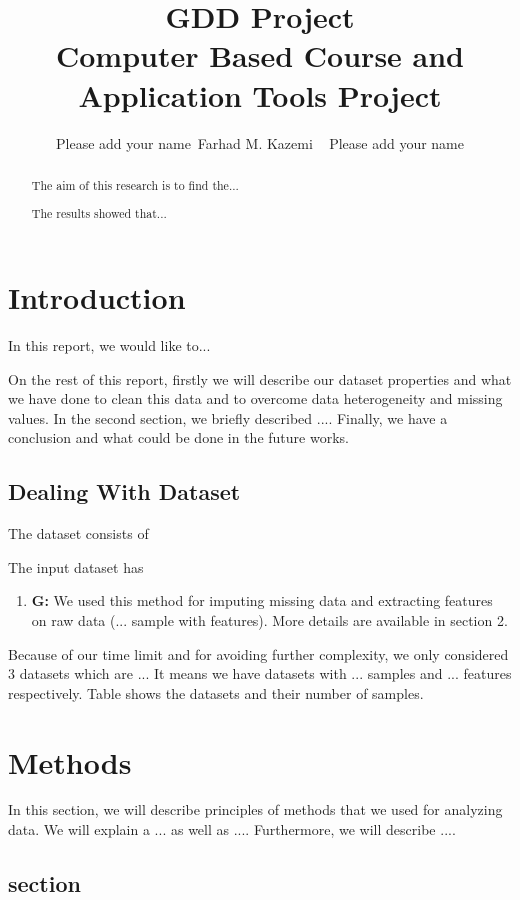 \documentclass[12pt,letterpaper]{article}
\begin{document}
\title{GDD Project \\ \vspace{.5 cm} {\Large Computer Based Course and Application Tools Project} }
\author{Please add your name~Farhad M. Kazemi ~ Please add your name}
\maketitle
\begin{abstract}
The aim of this research is to find the...

The results showed that...
\end{abstract}

\section{Introduction}

In this report, we would like to...

On the rest of this report, firstly we will describe our dataset properties and what we have done to clean this data and to overcome data heterogeneity and missing values. In the second section, we briefly described ....
Finally, we have a conclusion and what could be done in the future works.
\subsection{Dealing With Dataset}
The dataset consists of 

The input dataset has 
\begin{enumerate}
\item \textbf{G:} We used this method for imputing missing data and extracting features on raw data (... sample with features). More details are available in section 2.
\end{enumerate}
\noindent Because of our time limit and for avoiding further complexity, we only considered 3 datasets which are ... 
It means we have datasets with ... samples and ... features respectively. Table shows the datasets and their number of samples.
\section{Methods}
In this section, we will describe principles of methods that we used for analyzing data. We will explain a ... as well as ....  Furthermore, we will describe .... 
\subsection{ section}
\end{document}
